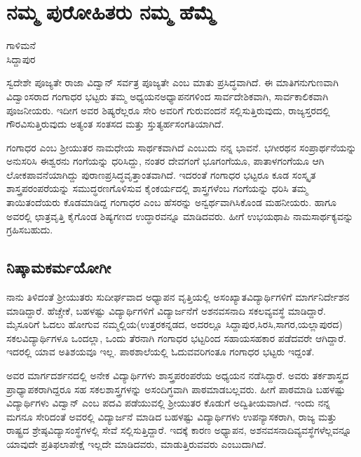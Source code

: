 {\fontsize{14}{16}\selectfont
\chapter{ನಮ್ಮ ಪುರೋಹಿತರು   \eng{-} ನಮ್ಮ ಹೆಮ್ಮೆ}

\begin{center}
\smallskip

ಗಾಳಿಮನೆ\\ 
ಸಿದ್ದಾಪುರ	
\addrule
\end{center}

ಸ್ವದೇಶೇ ಪೂಜ್ಯತೇ ರಾಜಾ ವಿದ್ವಾನ್ ಸರ್ವತ್ರ ಪೂಜ್ಯತೇ ಎಂಬ ಮಾತು ಪ್ರಸಿದ್ಧ\-ವಾಗಿದೆ. ಈ ಮಾತಿಗನುಗುಣವಾಗಿ ವಿದ್ವಾಂಸರಾದ ಗಂಗಾಧರ ಭಟ್ಟರು ತಮ್ಮ ಅಧ್ಯಯನ\enginline{-}ಅಧ್ಯಾಪನಗಳಿಂದ ಸಾರ್ವದೇಶಿಕವಾಗಿ, ಸಾರ್ವಕಾಲಿಕವಾಗಿ ಪೂಜನೀಯರು. ಇದೀಗ ಅವರ ಶಿಷ್ಯರೆಲ್ಲರೂ ಸೇರಿ ಅವರಿಗೆ ಗುರುವಂದನೆ ಸಲ್ಲಿಸುತ್ತಿರುವುದು, ರಾಜ್ಯ\-ಸ್ತರದಲ್ಲಿ ಗೌರವಿಸುತ್ತಿರುವುದು ಅತ್ಯಂತ ಸಂತಸದ ಮತ್ತು ಸ್ತುತ್ಯರ್ಹಸಂಗತಿಯಾಗಿದೆ. 

ಗಂಗಾಧರ ಎಂಬ ಶ್ರೀಯುತರ ನಾಮಧೇಯ ಸಾರ್ಥಕವಾಗಿದೆ ಎಂಬುದು ನನ್ನ ಭಾವನೆ. ಭಗೀರಥನ ಸಂಪ್ರಾರ್ಥನೆಯನ್ನು ಅನುಸರಿಸಿ ಈಶ್ವರನು \hbox{ಗಂಗೆಯನ್ನು} \hbox{ಧರಿಸಿದ್ದು}, ನಂತರ  ದೇವಗಂಗೆ ಭೂಗಂಗೆಯೂ, ಪಾತಾಳಗಂಗೆಯೂ ಆಗಿ ಲೋಕಪಾವನೆ\-ಯಾಗಿದ್ದು ಪುರಾಣಪ್ರಸಿದ್ಧವೃತ್ತಾಂತವಾಗಿದೆ. ಇದರಂತೆ ಗಂಗಾಧರ ಭಟ್ಟರೂ ಕೂಡ ಸಂಸ್ಕೃತ  \enginline{-}  ಶಾಸ್ತ್ರಪರಂಪರೆಯನ್ನು ಸಮುದ್ಧರಣಗೊಳಿಸುವ ಕೈಂಕರ್ಯದಲ್ಲಿ \hbox{ಶಾಸ್ತ್ರಗಳೆಂಬ} ಗಂಗೆಯನ್ನು ಧರಿಸಿ ತಮ್ಮ ತಾಯಿ\enginline{-}ತಂದೆಯರು ಕೊಡಮಾಡಿದ್ದ ಗಂಗಾಧರ ಎಂಬ ಹೆಸರನ್ನು ಅನ್ವರ್ಥವಾಗಿಸಿಕೊಂಡ ಮಹನೀಯರು. ಹಾಗೂ \hbox{ಅವರಲ್ಲಿ} ಛಾತ್ರವೃತ್ತಿ ಕೈಗೊಂಡ ಶಿಷ್ಯಗಣದ ಉದ್ಧಾರವನ್ನೂ ಮಾಡಿದವರು. ಹೀಗೆ ಉಭಯಥಾಪಿ ನಾಮ\-ಸಾರ್ಥಕ್ಯವನ್ನು ಗ್ರಹಿಸಬಹುದು. 

\section*{ನಿಷ್ಕಾಮಕರ್ಮಯೋಗೀ} 

ನಾನು ತಿಳಿದಂತೆ ಶ್ರೀಯುತರು ಸುದೀರ್ಘವಾದ ಅಧ್ಯಾಪನ ವೃತ್ತಿಯಲ್ಲಿ ಅಸಂಖ್ಯಾತ\-ವಿದ್ಯಾರ್ಥಿಗಳಿಗೆ ಮಾರ್ಗನಿರ್ದೇಶನ ಮಾಡಿದ್ದಾರೆ. ಹೆಚ್ಚೇಕೆ, ಬಹಳಷ್ಟು ವಿದ್ಯಾರ್ಥಿ\-ಗಳಿಗೆ ವಿದ್ಯಾರ್ಜನೆಗೆ ಅಶನ\enginline{-}ವಸನಾದಿ ಸಕಲವ್ಯವಸ್ಥೆ ಮಾಡಿದ್ದಾರೆ. ಮೈಸೂರಿಗೆ ಓದಲು ಹೋಗುವ ನಮ್ಮಲ್ಲಿಯ(ಉತ್ತರಕನ್ನಡದ, ಅದರಲ್ಲೂ ಸಿದ್ದಾಪುರ,ಸಿರಸಿ,ಸಾಗರ,ಯಲ್ಲಾ\-ಪುರದ) ಸಕಲವಿದ್ಯಾರ್ಥಿಗಳೂ ಒಂದಲ್ಲಾ, ಒಂದು ತೆರನಾಗಿ ಗಂಗಾಧರ ಭಟ್ಟರಿಂದ ಸಹಾಯ\enginline{-}ಸಹಕಾರ ಪಡೆದವರೇ ಆಗಿದ್ದಾರೆ. ಇದರಲ್ಲಿ ಯಾವ ಅತಿಶಯವೂ ಇಲ್ಲ. ಪಾಠಶಾಲೆಯಲ್ಲಿ ಓದುವವರಿಗಂತೂ ಗಂಗಾಧರ ಭಟ್ಟರು  ಇದ್ದಂತೆ.  

ಅವರ ಮಾರ್ಗದರ್ಶನದಲ್ಲಿ ಅನೇಕ ವಿದ್ಯಾರ್ಥಿಗಳು ಶಾಸ್ತ್ರಪರಂಪರೆಯ ಅಧ್ಯಯನ ನಡೆಸಿದ್ದಾರೆ. ಅವರು ತರ್ಕಶಾಸ್ತ್ರದ ಪ್ರಾಧ್ಯಾಪಕರಾಗಿದ್ದರೂ ಸಹ ಸಕಲ\-ಶಾಸ್ತ್ರ\-ಗಳನ್ನು ಅಸಂದಿಗ್ಧವಾಗಿ  ಪಾಠಮಾಡಬಲ್ಲವರು. ಹೀಗೆ ಪಾಠಮಾಡಿ ಬಹಳಷ್ಟು ವಿದ್ಯಾರ್ಥಿ\-ಗಳು ವಿದ್ವಾನ್ ಎಂಬ ಪದವಿ ಪಡೆಯುವಲ್ಲಿ ಶ್ರೀಯುತರ ಕೊಡುಗೆ ಅದ್ವಿತೀಯವಾಗಿದೆ. ಇಂದು ನನ್ನ ಮಗನೂ ಸೇರಿದಂತೆ ಅವರಲ್ಲಿ ವಿದ್ಯಾರ್ಜನೆ ಮಾಡಿದ ಬಹಳಷ್ಟು ವಿದ್ಯಾರ್ಥಿಗಳು ಉಪನ್ಯಾಸಕರಾಗಿ,  ರಾಜ್ಯ ಮತ್ತು ರಾಷ್ಟ್ರದ ಶ್ರೇಷ್ಠವಿದ್ಯಾಸಂಸ್ಥೆಗಳಲ್ಲಿ ಸೇವೆ ಸಲ್ಲಿಸುತ್ತಿದ್ದಾರೆ. ಇದಕ್ಕೆ ಕಾರಣ ಅಧ್ಯಾಪನ, ಅಶನ\enginline{-}ವಸನಾದಿವ್ಯವಸ್ಥೆಗಳೆಲ್ಲವನ್ನೂ ಯಾವುದೇ ಪ್ರತಿಫಲಾಪೇಕ್ಷೆ ಇಲ್ಲದೇ ಮಾಡಿದವರು, ಮಾಡುತ್ತಿರುವವರು ಎಂಬುದಾಗಿದೆ. 

}
